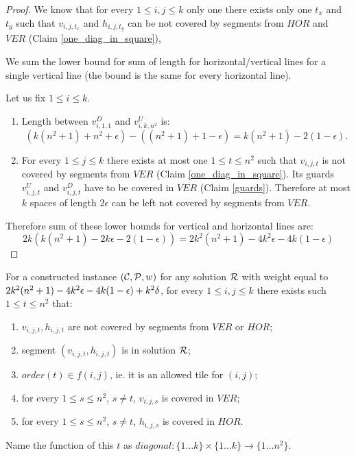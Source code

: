 \begin{proof}
We know that for every $1 \le i,j \le k$
only one there exists only one $t_x$ and $t_y$ such that
$v_{i,j,t_x}$ and $h_{i,j,t_y}$
can be not covered by
segments from $HOR$ and $VER$ (Claim \ref{one_diag_in_square}),


We sum the lower bound for sum of length for horizontal/vertical
lines for a single vertical line
(the bound is the same for every horizontal line).

Let us fix $1 \le i \le k$.

\begin{enumerate}[label={(\arabic*)}]
\item Length between $v^D_{i, 1, 1}$ and $v^U_{i, k, n^2}$ is:
$$(k(n^2+1) + n^2 +\epsilon) - ((n^2+1)+1 -\epsilon) = k(n^2+1) - 2(1 - \epsilon).$$

\item For every $1 \le j \le k$ there exists at most one $1 \le t \le n^2$
such that $v_{i,j,t}$ is not covered by segments from $VER$
(Claim \ref{one_diag_in_square}).
Its guards $v^U_{i,j,t}$ and $v^D_{i,j,t}$
have to be covered in $VER$ (Claim \ref{guards}).
Therefore at most $k$ spaces of length $2\epsilon$ can be left
not covered by segments from $VER$.

\end{enumerate}
Therefore sum of these lower bounds for vertical and horizontal lines are:
$$2k(k(n^2+1) -2k\epsilon -2(1-\epsilon)) = 2k^2(n^2+1) -4k^2\epsilon -4k(1-\epsilon)$$
\end{proof}

\begin{lemma}
\label{diag_correct}
For a constructed instance $(\mathcal{C}, \mathcal{P}, w)$
for any solution $\mathcal{R}$ with weight equal to $2k^2(n^2+1) - 4k^2\epsilon -4k(1-\epsilon) +k^2\delta$,
for every $1 \le i,j \le k$
there exists such $1 \le t \le n^2$ that:
\begin{enumerate}[label={(\arabic*)}]
\item $v_{i,j,t}, h_{i,j,t}$ are not covered by segments from $VER$ or $HOR$;
\item segment $(v_{i,j,t}, h_{i,j,t})$ is in solution $\mathcal{R}$;
\item $order(t) \in f(i,j)$, ie. it is an allowed tile for $(i,j)$;
\item for every $1 \le s\le n^2$, $s \neq t$, $v_{i,j,s}$ is covered in $VER$;
\item for every $1 \le s\le n^2$, $s \neq t$, $h_{i,j,s}$ is covered in $HOR$.
\end{enumerate}
Name the function of this $t$ as
$diagonal : \{1 \ldots k\} \times \{1 \ldots k\} \rightarrow \{1 \ldots n^2\}$.
\end{lemma}

